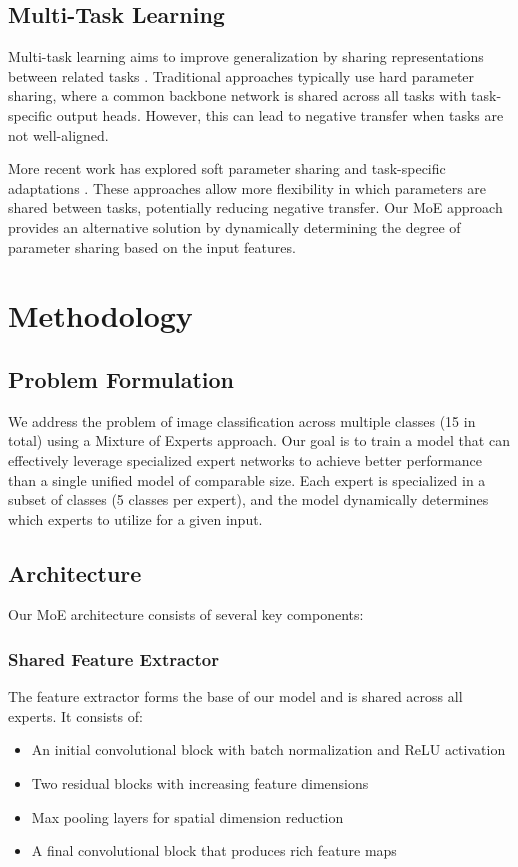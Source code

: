 \documentclass[conference]{IEEEtran}
\begin{document}
\subsection{Multi-Task Learning}
Multi-task learning aims to improve generalization by sharing representations between related tasks \cite{caruana1997multitask}. Traditional approaches typically use hard parameter sharing, where a common backbone network is shared across all tasks with task-specific output heads. However, this can lead to negative transfer when tasks are not well-aligned.

More recent work has explored soft parameter sharing \cite{misra2016cross} and task-specific adaptations \cite{ruder2019latent}. These approaches allow more flexibility in which parameters are shared between tasks, potentially reducing negative transfer. Our MoE approach provides an alternative solution by dynamically determining the degree of parameter sharing based on the input features.

\section{Methodology}
\subsection{Problem Formulation}
We address the problem of image classification across multiple classes (15 in total) using a Mixture of Experts approach. Our goal is to train a model that can effectively leverage specialized expert networks to achieve better performance than a single unified model of comparable size. Each expert is specialized in a subset of classes (5 classes per expert), and the model dynamically determines which experts to utilize for a given input.

\subsection{Architecture}
Our MoE architecture consists of several key components:

\subsubsection{Shared Feature Extractor}
The feature extractor forms the base of our model and is shared across all experts. It consists of:
\begin{itemize}
    \item An initial convolutional block with batch normalization and ReLU activation
    \item Two residual blocks with increasing feature dimensions
    \item Max pooling layers for spatial dimension reduction
    \item A final convolutional block that produces rich feature maps
\end{itemize}
\end{document}
